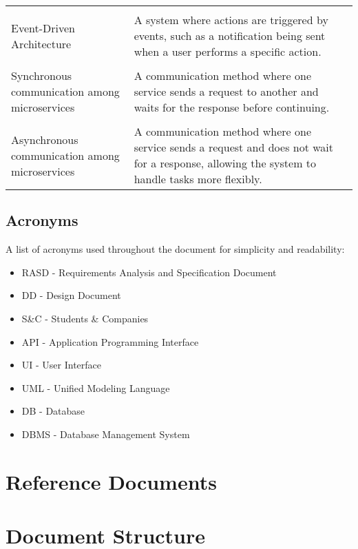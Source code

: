 \begin{longtable}{p{}p{}}
    \vspace{0.5em}\\
    Event-Driven Architecture & A system where actions are triggered by events, such as a notification being sent when
    a user performs a specific action. \\
    
    \vspace{0.5em}\\
    Synchronous communication among microservices & A communication method where one service sends a request to another
    and waits for the response before continuing. \\
    
    \vspace{0.5em}\\
    Asynchronous communication among microservices & A communication method where one service sends a request and does
    not wait for a response, allowing the system to handle tasks more flexibly. \\
    
\end{longtable}

\subsection{Acronyms}

A list of acronyms used throughout the document for simplicity and readability:
\\
\begin{itemize}
    \item {RASD} - Requirements Analysis and Specification Document
    \item {DD} - Design Document
    \item {S\&C} - Students \& Companies
    \item {API} - Application Programming Interface
    \item {UI} - User Interface
    \item {UML} - Unified Modeling Language
    \item {DB} - Database
    \item {DBMS} - Database Management System
\end{itemize}

\newpage
\section{Reference Documents}

\newpage
\section{Document Structure}